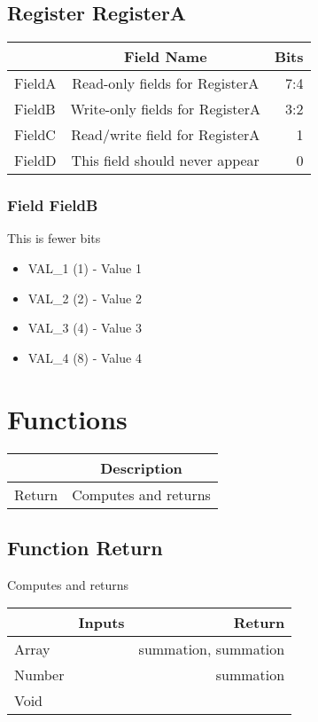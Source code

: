 \documentclass[a4paper,12pt,oneside,pdflatex,italian,final,twocolumn]{article}
\begin{document}
\raggedright

\subsection{Register RegisterA}
\centering
\begin{tabular}{lcr}
\toprule
  & Field Name & Bits \\
\midrule
FieldA & Read-only fields for RegisterA &
7:4
\\
FieldB & Write-only fields for RegisterA &
3:2
\\
FieldC & Read/write field for RegisterA &
1
\\
FieldD & This field should never appear &
0
\\
\bottomrule

\end{tabular}


\raggedright

\subsubsection{Field FieldB }

This is fewer bits

\begin{itemize}
\item VAL\_1 (1) - Value 1
\item VAL\_2 (2) - Value 2
\item VAL\_3 (4) - Value 3
\item VAL\_4 (8) - Value 4
\end{itemize}




\raggedright

\section{Functions}

\centering
\begin{tabular}{lc}
\toprule
  & Description \\
\midrule
Return & Computes and returns \\
\bottomrule
\end{tabular}


\raggedright
\subsection{Function Return }
Computes and returns \\

\centering
\begin{tabular}{lcr}
\toprule
  & Inputs & Return \\
\midrule
Array &
&
summation, 
summation
\\
Number &
&
summation
\\
Void &
&
\\
\bottomrule
\end{tabular}



\raggedright
\end{document}
